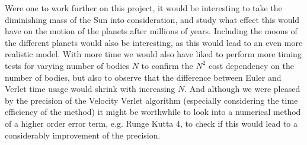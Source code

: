 \documentclass[12pt]{article}
\numberwithin{figure}{section}
\numberwithin{table}{section}
\begin{document}
\noindent Were one to work further on this project, it would be interesting to take the diminishing mass of the Sun into consideration, and study what effect this would have on the motion of the planets after millions of years. Including the moons of the different planets would also be interesting, as this would lead to an even more realistic model. With more time we would also have liked to perform more timing tests for varying number of bodies $N$ to confirm the $N^2$ cost dependency on the number of bodies, but also to observe that the difference between Euler and Verlet time usage would shrink with increasing $N$. And although we were pleased by the precision of the Velocity Verlet algorithm (especially considering the time efficiency of the method) it might be worthwhile to look into a numerical method of a higher order error term, e.g. Runge Kutta 4, to check if this would lead to a considerably improvement of the precision.

\pagebreak

{}

\end{document}
